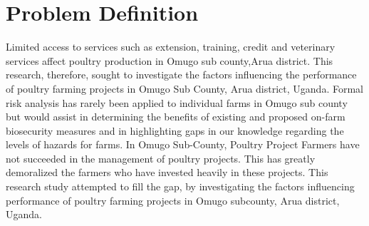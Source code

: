 \chapter{Problem Definition}
Limited access to services such as extension, training, credit and veterinary services affect poultry production in Omugo sub county,Arua district. This research, therefore, sought to investigate the factors influencing the performance of poultry farming projects in Omugo Sub County, Arua district, Uganda. Formal risk analysis has rarely been applied to individual farms in Omugo sub county but would assist in determining the benefits of existing and proposed on-farm biosecurity measures and in highlighting gaps in our knowledge regarding the levels of hazards for farms.
In Omugo Sub-County, Poultry Project Farmers have not succeeded in the management of poultry projects. This has greatly demoralized the farmers who have invested heavily in these projects. This research study attempted to fill the gap, by investigating the factors influencing performance of poultry farming projects in Omugo subcounty, Arua district, Uganda.